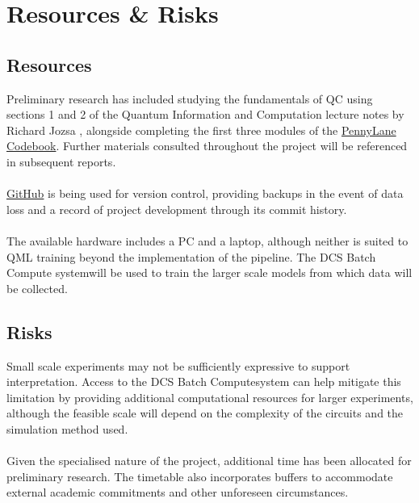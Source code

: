 
\section{Resources \& Risks}
\label{sec:ResourcesAndRisks}

\subsection{Resources}
\large{\raggedright
Preliminary research has included studying the fundamentals of QC using sections 1 and 2 of the Quantum Information and Computation lecture notes by Richard Jozsa \cite{Jozsa19}, alongside completing the first three modules of the \href{https://pennylane.ai/codebook#modules}{\color{blue} PennyLane Codebook}. Further materials consulted throughout the project will be referenced in subsequent reports.\\
~\\
\href{https://github.com/Freddie-Audley/3rd-Year-Dissertation}{\color{blue} GitHub} is being used for version control, providing backups in the event of data loss and a record of project development through its commit history.\\
~\\
The available hardware includes a PC and a laptop, although neither is suited to QML training beyond the implementation of the pipeline. The DCS Batch Compute system\footnotemark[1] will be used to train the larger scale models from which data will be collected.
\par
}

\subsection{Risks}
\large{\raggedright
Small scale experiments may not be sufficiently expressive to support interpretation. Access to the DCS Batch Compute\footnotemark[1] system can help mitigate this limitation by providing additional computational resources for larger experiments, although the feasible scale will depend on the complexity of the circuits and the simulation method used.\\
~\\
Given the specialised nature of the project, additional time has been allocated for preliminary research. The timetable also incorporates buffers to accommodate external academic commitments and other unforeseen circumstances.
\par
}

